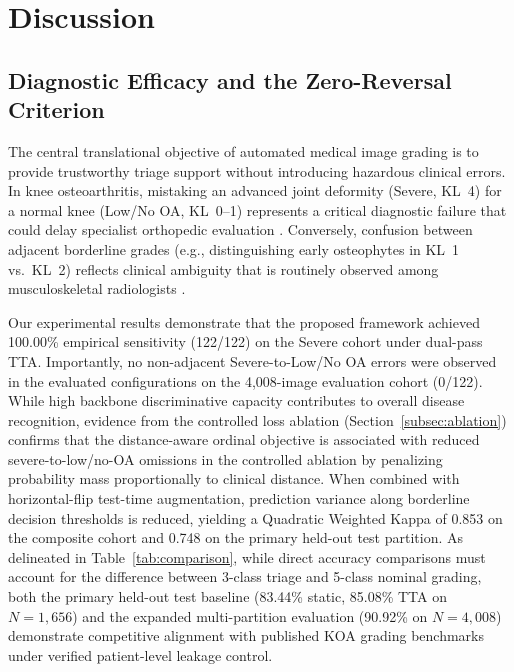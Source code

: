 \documentclass[10pt,journal]{IEEEtran}
\begin{document}
\section{Discussion}
\label{sec:discussion}

\subsection{Diagnostic Efficacy and the Zero-Reversal Criterion}
\label{subsec:clinical_efficacy}

The central translational objective of automated medical image grading is to provide trustworthy triage support without introducing hazardous clinical errors. In knee osteoarthritis, mistaking an advanced joint deformity (Severe, KL~4) for a normal knee (Low/No OA, KL~0--1) represents a critical diagnostic failure that could delay specialist orthopedic evaluation \cite{carr2012knee}. Conversely, confusion between adjacent borderline grades (e.g., distinguishing early osteophytes in KL~1 vs.\ KL~2) reflects clinical ambiguity that is routinely observed among musculoskeletal radiologists \cite{sheehy2015validity}.

Our experimental results demonstrate that the proposed framework achieved 100.00\% empirical sensitivity (122/122) on the Severe cohort under dual-pass TTA. Importantly, no non-adjacent Severe-to-Low/No OA errors were observed in the evaluated configurations on the 4,008-image evaluation cohort (0/122). While high backbone discriminative capacity contributes to overall disease recognition, evidence from the controlled loss ablation (Section~\ref{subsec:ablation}) confirms that the distance-aware ordinal objective is associated with reduced severe-to-low/no-OA omissions in the controlled ablation by penalizing probability mass proportionally to clinical distance. When combined with horizontal-flip test-time augmentation, prediction variance along borderline decision thresholds is reduced, yielding a Quadratic Weighted Kappa of 0.853 on the composite cohort and 0.748 on the primary held-out test partition. As delineated in Table~\ref{tab:comparison}, while direct accuracy comparisons must account for the difference between 3-class triage and 5-class nominal grading, both the primary held-out test baseline (83.44\% static, 85.08\% TTA on $N = 1{,}656$) and the expanded multi-partition evaluation (90.92\% on $N = 4{,}008$) demonstrate competitive alignment with published KOA grading benchmarks under verified patient-level leakage control.
\end{document}
